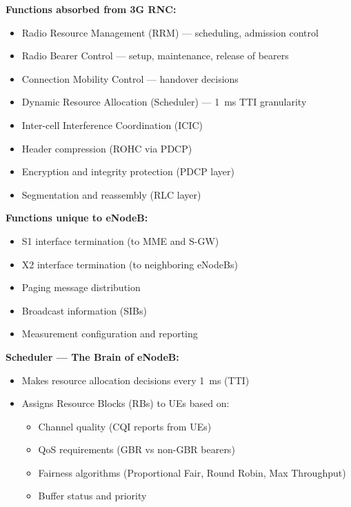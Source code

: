\textbf{Functions absorbed from 3G RNC:}

\begin{itemize}
\tightlist
\item
  Radio Resource Management (RRM) — scheduling, admission control
\item
  Radio Bearer Control — setup, maintenance, release of bearers
\item
  Connection Mobility Control — handover decisions
\item
  Dynamic Resource Allocation (Scheduler) — 1~ms TTI granularity
\item
  Inter-cell Interference Coordination (ICIC)
\item
  Header compression (ROHC via PDCP)
\item
  Encryption and integrity protection (PDCP layer)
\item
  Segmentation and reassembly (RLC layer)
\end{itemize}

\textbf{Functions unique to eNodeB:}

\begin{itemize}
\tightlist
\item
  S1 interface termination (to MME and S-GW)
\item
  X2 interface termination (to neighboring eNodeBs)
\item
  Paging message distribution
\item
  Broadcast information (SIBs)
\item
  Measurement configuration and reporting
\end{itemize}

\textbf{Scheduler — The Brain of eNodeB:}

\begin{itemize}
\tightlist
\item
  Makes resource allocation decisions every 1~ms (TTI)
\item
  Assigns Resource Blocks (RBs) to UEs based on:

  \begin{itemize}
  \tightlist
  \item
    Channel quality (CQI reports from UEs)
  \item
    QoS requirements (GBR vs non-GBR bearers)
  \item
    Fairness algorithms (Proportional Fair, Round Robin, Max Throughput)
  \item
    Buffer status and priority
  \end{itemize}
\end{itemize}

